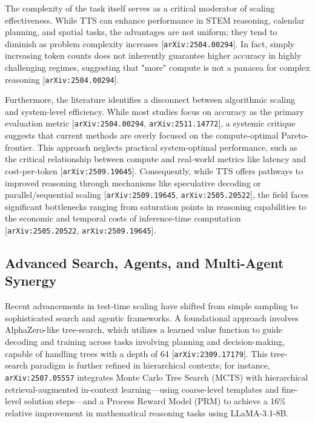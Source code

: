 \documentclass[11pt]{article}
\begin{document}
The complexity of the task itself serves as a critical moderator of scaling effectiveness. While TTS can enhance performance in STEM reasoning, calendar planning, and spatial tasks, the advantages are not uniform; they tend to diminish as problem complexity increases [\texttt{arXiv:2504.00294}]. In fact, simply increasing token counts does not inherently guarantee higher accuracy in highly challenging regimes, suggesting that "more" compute is not a panacea for complex reasoning [\texttt{arXiv:2504.00294}].

Furthermore, the literature identifies a disconnect between algorithmic scaling and system-level efficiency. While most studies focus on accuracy as the primary evaluation metric [\texttt{arXiv:2504.00294}, \texttt{arXiv:2511.14772}], a systemic critique suggests that current methods are overly focused on the compute-optimal Pareto-frontier. This approach neglects practical system-optimal performance, such as the critical relationship between compute and real-world metrics like latency and cost-per-token [\texttt{arXiv:2509.19645}]. Consequently, while TTS offers pathways to improved reasoning through mechanisms like speculative decoding or parallel/sequential scaling [\texttt{arXiv:2509.19645}, \texttt{arXiv:2505.20522}], the field faces significant bottlenecks ranging from saturation points in reasoning capabilities to the economic and temporal costs of inference-time computation [\texttt{arXiv:2505.20522}, \texttt{arXiv:2509.19645}].

\subsection{Advanced Search, Agents, and Multi-Agent Synergy}

Recent advancements in test-time scaling have shifted from simple sampling to sophisticated search and agentic frameworks. A foundational approach involves AlphaZero-like tree-search, which utilizes a learned value function to guide decoding and training across tasks involving planning and decision-making, capable of handling trees with a depth of 64 [\texttt{arXiv:2309.17179}]. This tree-search paradigm is further refined in hierarchical contexts; for instance, \texttt{arXiv:2507.05557} integrates Monte Carlo Tree Search (MCTS) with hierarchical retrieval-augmented in-context learning—using coarse-level templates and fine-level solution steps—and a Process Reward Model (PRM) to achieve a 16\% relative improvement in mathematical reasoning tasks using LLaMA-3.1-8B.
\end{document}
